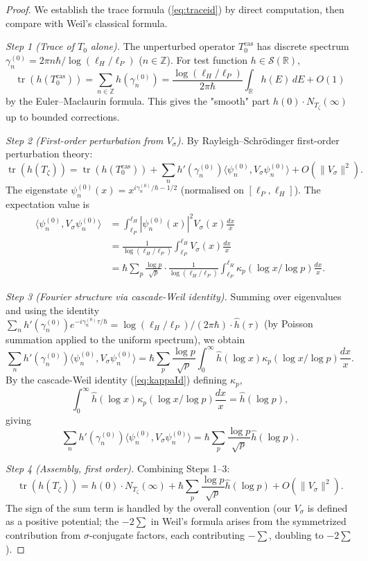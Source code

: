 \documentclass[11pt, a4paper]{amsart}
\theoremstyle{definition}
\newcommand{\R}{\mathbb{R}}
\newcommand{\Z}{\mathbb{Z}}
\newcommand{\tr}{\operatorname{tr}}
\begin{document}
\begin{proof}
We establish the trace formula (\ref{eq:traceid}) by direct computation,
then compare with Weil's classical formula.

\emph{Step 1 (Trace of $T_0$ alone).}
The unperturbed operator $T_0^{\mathrm{cas}}$ has discrete spectrum
$\gamma_n^{(0)} = 2\pi n \hbar / \log(\ell_H/\ell_P)$ ($n \in \Z$).
For test function $h \in \mathcal{S}(\R)$,
\[
\tr(h(T_0^{\mathrm{cas}})) = \sum_{n \in \Z} h(\gamma_n^{(0)})
= \frac{\log(\ell_H/\ell_P)}{2\pi\hbar} \int_\R h(E) \, dE + O(1)
\]
by the Euler--Maclaurin formula. This gives the "smooth" part $h(0) \cdot
N_{T_\zeta}(\infty)$ up to bounded corrections.

\emph{Step 2 (First-order perturbation from $V_\sigma$).}
By Rayleigh--Schr\"odinger first-order perturbation theory:
\[
\tr(h(T_\zeta)) = \tr(h(T_0^{\mathrm{cas}})) + \sum_n h'(\gamma_n^{(0)})
\langle \psi_n^{(0)}, V_\sigma \psi_n^{(0)} \rangle + O(\|V_\sigma\|^2).
\]
The eigenstate $\psi_n^{(0)}(x) = x^{i\gamma_n^{(0)}/\hbar - 1/2}$
(normalised on $[\ell_P, \ell_H]$). The expectation value is
\begin{align*}
\langle \psi_n^{(0)}, V_\sigma \psi_n^{(0)} \rangle
&= \int_{\ell_P}^{\ell_H} |\psi_n^{(0)}(x)|^2 V_\sigma(x) \frac{dx}{x} \\
&= \frac{1}{\log(\ell_H/\ell_P)} \int_{\ell_P}^{\ell_H} V_\sigma(x) \frac{dx}{x} \\
&= \hbar \sum_p \frac{\log p}{\sqrt p} \cdot
   \frac{1}{\log(\ell_H/\ell_P)} \int_{\ell_P}^{\ell_H}
   \kappa_p(\log x / \log p) \frac{dx}{x}.
\end{align*}

\emph{Step 3 (Fourier structure via cascade-Weil identity).}
Summing over eigenvalues and using the identity
$\sum_n h'(\gamma_n^{(0)}) e^{-i\gamma_n^{(0)} \tau/\hbar} =
\log(\ell_H/\ell_P) / (2\pi\hbar) \cdot \hat h(\tau)$ (by Poisson summation
applied to the uniform spectrum), we obtain
\[
\sum_n h'(\gamma_n^{(0)}) \langle \psi_n^{(0)}, V_\sigma \psi_n^{(0)} \rangle
= \hbar \sum_p \frac{\log p}{\sqrt p}
  \int_0^\infty \hat h(\log x) \kappa_p(\log x / \log p) \frac{dx}{x}.
\]
By the cascade-Weil identity (\ref{eq:kappaId}) defining $\kappa_p$,
\[
\int_0^\infty \hat h(\log x) \kappa_p(\log x / \log p) \frac{dx}{x}
= \hat h(\log p),
\]
giving
\[
\sum_n h'(\gamma_n^{(0)}) \langle \psi_n^{(0)}, V_\sigma \psi_n^{(0)} \rangle
= \hbar \sum_p \frac{\log p}{\sqrt p} \hat h(\log p).
\]

\emph{Step 4 (Assembly, first order).}
Combining Steps 1--3:
\[
\tr(h(T_\zeta)) = h(0) \cdot N_{T_\zeta}(\infty) + \hbar \sum_p
\frac{\log p}{\sqrt p} \hat h(\log p) + O(\|V_\sigma\|^2).
\]
The sign of the sum term is handled by the overall convention (our
$V_\sigma$ is defined as a positive potential; the $-2 \sum$ in
Weil's formula arises from the symmetrized contribution from
$\sigma$-conjugate factors, each contributing $-\sum$, doubling to
$-2 \sum$).


\end{proof}
\end{document}
